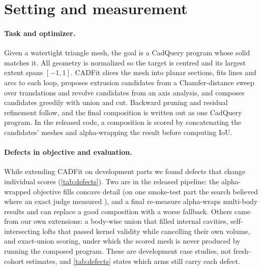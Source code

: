 \section{Setting and measurement}
\label{sec:measure}

\paragraph{Task and optimizer.}
Given a watertight triangle mesh, the goal is a CadQuery \citep{cadquery} program whose solid matches it. All geometry is normalized so the target is centred and its largest extent spans $[-1,1]$. CADFit \citep{nehme2026cadfit} slices the mesh into planar sections, fits lines and arcs to each loop, proposes extrusion candidates from a Chamfer-distance sweep over translations and revolve candidates from an axis analysis, and composes candidates greedily with union and cut. Backward pruning and residual refinement follow, and the final composition is written out as one CadQuery program. In the released code, a composition is scored by concatenating the candidates' meshes and alpha-wrapping \citep{portaneri2022alphawrap} the result before computing IoU.

\paragraph{Defects in objective and evaluation.}
While extending CADFit on development parts we found defects that change individual scores (\cref{tab:defects}). Two are in the released pipeline: the alpha-wrapped objective fills concave detail (on one smoke-test part the search believed \objBelieved{} where an exact judge measured \objStrict), and a final re-measure alpha-wraps multi-body results and can replace a good composition with a worse fallback. Others came from our own extensions: a body-wise union that filled internal cavities, self-intersecting lofts that passed kernel validity while cancelling their own volume, and exact-union scoring, under which the scored mesh is never produced by running the composed program. These are development case studies, not fresh-cohort estimates, and \cref{tab:defects} states which arms still carry each defect.

\begin{table}[t]
\centering
\caption{Defects found on development, smoke and earlier test parts (not the fresh cohort), with where each comes from, the case where we observed it, and its status in the fresh arms. Records: \texttt{results/defect\_cases.json}.}
\label{tab:defects}
\scriptsize
\resizebox{\linewidth}{!}{}
\end{table}

